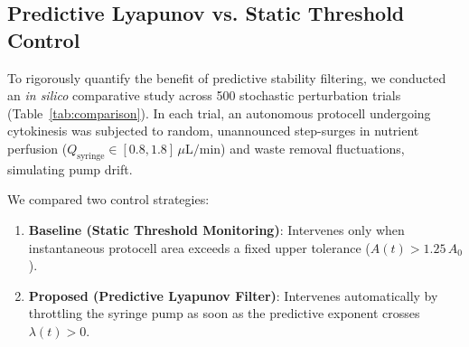 \documentclass[letterpaper]{article}
\begin{document}
\begin{table}[h]
\centering
\caption{\textbf{Computational Latency and Lookahead Benchmarks across Lattice Resolutions.}}
\label{tab:benchmarks}
\vspace{1mm}
\end{table}

\subsection{Predictive Lyapunov vs. Static Threshold Control}

To rigorously quantify the benefit of predictive stability filtering, we conducted an \textit{in silico} comparative study across 500 stochastic perturbation trials (Table~\ref{tab:comparison}). In each trial, an autonomous protocell undergoing cytokinesis was subjected to random, unannounced step-surges in nutrient perfusion ($Q_{\text{syringe}} \in [0.8, 1.8]\,\mu\text{L/min}$) and waste removal fluctuations, simulating pump drift.

We compared two control strategies:
\begin{enumerate}
    \item \textbf{Baseline (Static Threshold Monitoring)}: Intervenes only when instantaneous protocell area exceeds a fixed upper tolerance ($A(t) > 1.25\,A_0$).
    \item \textbf{Proposed (Predictive Lyapunov Filter)}: Intervenes automatically by throttling the syringe pump as soon as the predictive exponent crosses $\lambda(t) > 0$.
\end{enumerate}
\end{document}
